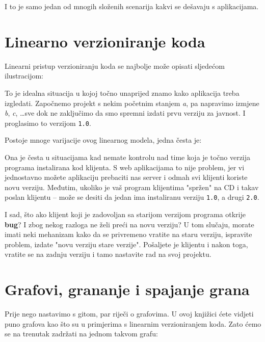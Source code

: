 I to je samo jedan od mnogih složenih scenarija kakvi se dešavaju s aplikacijama.

\section*{Linearno verzioniranje koda}

Linearni pristup verzioniranju koda se najbolje može opisati sljedećom ilustracijom:



To je idealna situacija u kojoj točno unaprijed znamo kako aplikacija treba izgledati. 
Započnemo projekt s nekim početnim stanjem \emph a, pa napravimo izmjene \emph b, \emph c, \dots sve dok ne zaključimo da smo spremni izdati prvu verziju za javnost.
I proglasimo to verzijom \texttt{1.0}. 

Postoje mnoge varijacije ovog linearnog modela, jedna česta je:



Ona je česta u situacijama kad nemate kontrolu nad time koja je točno verzija programa instalirana kod klijenta. 
S web aplikacijama to nije problem, jer vi jednostavno možete aplikaciju prebaciti nas server i odmah svi klijenti koriste novu verziju.
Međutim, ukoliko je vaš program klijentima "spržen" na CD i takav poslan klijentu -- može se desiti da jedan ima instaliranu verziju \texttt{1.0}, a drugi \texttt{2.0}.

I sad, što ako klijent koji je zadovoljan sa starijom verzijom programa otkrije \textbf{bug}?
I zbog nekog razloga ne želi preći na novu verziju?
U tom slučaju, morate imati neki mehanizam kako da se privremeno vratite na staru verziju, ispravite problem, izdate "novu verziju stare verzije". 
Pošaljete je klijentu i nakon toga, vratite se na zadnju verziju i tamo nastavite rad na svoj projektu.

\section*{Grafovi, grananje i spajanje grana}

Prije nego nastavimo s gitom, par riječi o grafovima. 
U ovoj knjižici ćete vidjeti puno grafova kao što su u primjerima s linearnim verzioniranjem koda. 
Zato ćemo se na trenutak zadržati na jednom takvom grafu:

